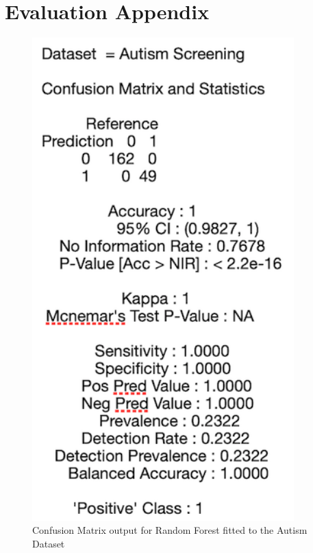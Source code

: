 \chapter{Evaluation Appendix}
\begin{figure}[!htbp]
    \centering
    \begin{minipage}{0.45\textwidth}
        \centering
        \includegraphics[width=0.9\textwidth]{ThesisTemplate/appendix/images/Chapter5Appendix/ConfusionMatrix/Autism.png} 
        \caption{Confusion Matrix output for Random Forest fitted to the Autism Dataset}
        \label{fig:matrixAutism}
    \end{minipage}\hfill

\end{figure}
